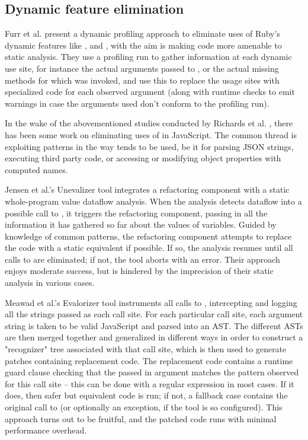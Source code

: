 \subsection{Dynamic feature elimination}

Furr et al. \cite{ProfileGuidedStaticTyping} present a dynamic profiling
approach to eliminate uses of Ruby's dynamic features like ,
 and , with the aim is making code more
amenable to static analysis. They use a profiling run to gather information at
each dynamic use site, for instance the actual arguments passed to ,
or the actual missing methods for which  was invoked, and
use this to replace the usage sites with specialized code for each observed
argument (along with runtime checks to emit warnings in case the arguments used
don't conform to the profiling run).

In the wake of the abovementioned studies conducted by Richards et al.
\cite{DynamicBehaviorJavaScript, TheEvalThatMenDo}, there has been some work on
eliminating uses of  in JavaScript. The common thread is exploiting
patterns in the way  tends to be used, be it for parsing JSON
strings, executing third party code, or accessing or modifying object
properties with computed names.

Jensen et al.'s Unevalizer tool \cite{RemedyingTheEvalThatMenDo} integrates a
refactoring component with a static whole-program value dataflow analysis. When
the analysis detects dataflow into a possible call to , it triggers
the refactoring component, passing in all the information it has gathered so
far about the values of variables. Guided by knowledge of common patterns, the
refactoring component attempts to replace the code with a static equivalent if
possible. If so, the analysis resumes until all calls to  are
eliminated; if not, the tool aborts with an error. Their approach enjoys
moderate success, but is hindered by the imprecision of their static analysis
in various cases.

Meawad et al.'s \cite{EvalBegone} Evalorizer tool instruments all calls to
, intercepting and logging all the strings passed as each call site.
For each particular call site, each argument string is taken to be valid
JavaScript and parsed into an AST. The different ASTs are then merged together
and generalized in different ways in order to construct a "recognizer" tree
associated with that call site, which is then used to generate patches
containing replacement code. The replacement code contains a runtime guard
clause checking that the passed in argument matches the pattern observed for
this call site -- this can be done with a regular expression in most cases. If
it does, then safer but equivalent code is run; if not, a fallback case
contains the original call to  (or optionally an exception, if the
tool is so configured). This approach turns out to be fruitful, and the patched
code runs with minimal performance overhead.
